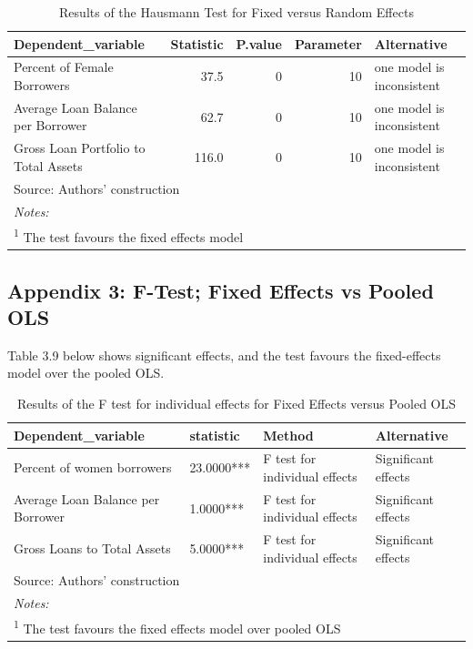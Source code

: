 \documentclass[a4paper, nobind]{templates/ociamthesis}
\begin{document}
\begin{table}[!h]

\caption{\label{tab:unnamed-chunk-83}Results of the Hausmann Test for Fixed versus Random Effects}
\centering
\fontsize{9}{11}\selectfont
\begin{tabular}[t]{lrrrl}
\toprule
Dependent\_variable & Statistic & P.value & Parameter & Alternative\\
\midrule
Percent of Female Borrowers & 37.5 & 0 & 10 & one model is inconsistent\\
Average Loan Balance per Borrower & 62.7 & 0 & 10 & one model is inconsistent\\
Gross Loan Portfolio to Total Assets & 116.0 & 0 & 10 & one model is inconsistent\\
\bottomrule
\multicolumn{5}{l}{\rule{0pt}{1em}Source: Authors' construction}\\
\multicolumn{5}{l}{\rule{0pt}{1em}\textit{Notes: }}\\
\multicolumn{5}{l}{\rule{0pt}{1em}\textsuperscript{1} The test favours the fixed effects model}\\
\end{tabular}
\end{table}

\hypertarget{appendix-3-f-test-fixed-effects-vs-pooled-ols}{%
\subsection{Appendix 3: F-Test; Fixed Effects vs Pooled OLS}\label{appendix-3-f-test-fixed-effects-vs-pooled-ols}}

Table 3.9 below shows significant effects, and the test favours the fixed-effects model over the pooled OLS.

\begin{table}[!h]

\caption{\label{tab:unnamed-chunk-84}Results of the F test for individual effects for Fixed Effects versus Pooled OLS}
\centering
\fontsize{9}{11}\selectfont
\begin{tabular}[t]{llll}
\toprule
Dependent\_variable & statistic & Method & Alternative\\
\midrule
Percent of women borrowers & 23.0000*** & F test for individual effects & Significant effects\\
Average Loan Balance per Borrower & 1.0000*** & F test for individual effects & Significant effects\\
Gross Loans to Total Assets & 5.0000*** & F test for individual effects & Significant effects\\
\bottomrule
\multicolumn{4}{l}{\rule{0pt}{1em}Source: Authors' construction}\\
\multicolumn{4}{l}{\rule{0pt}{1em}\textit{Notes: }}\\
\multicolumn{4}{l}{\rule{0pt}{1em}\textsuperscript{1} The test favours the fixed effects model over pooled OLS}\\
\end{tabular}
\end{table}
\end{document}
